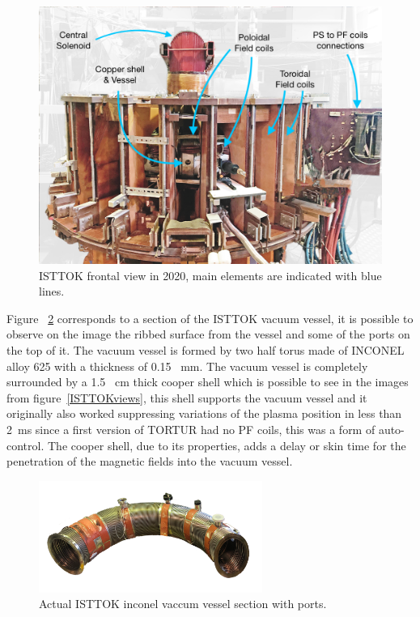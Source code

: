 \begin{figure}[htbp]
	\centering
	\includegraphics[width=1.1\textwidth]{Chp4/FrontISTTOK.png}
	\caption{\label{ISTTOK_front}ISTTOK frontal view in 2020, main elements are indicated with blue lines.   }
\end{figure}

Figure ~\ref{VV_IST} corresponds to a section of the ISTTOK vacuum vessel, it is possible to observe on the image the ribbed  surface from the vessel and some of the ports on the top of it. The vacuum vessel is formed by two half torus made of INCONEL alloy 625 with a thickness of 0.15~ mm. The vacuum vessel is completely surrounded by a 1.5 ~cm thick cooper shell which is possible to see in the images from figure~\ref{ISTTOKviews}, this shell supports the vacuum vessel and it originally  also worked suppressing  variations of the plasma position in less than 2~ms since a first version of TORTUR had no PF coils, this was a form of auto-control. The  cooper shell, due to its properties, adds a delay or skin time for the  penetration of the magnetic fields into the vacuum vessel.
\smallskip

\begin{figure}[htbp]
	\centering
	\includegraphics[width=0.65\textwidth]{Chp4/VacuumVessel_Low.png}
	\caption{\label{VV_IST} Actual ISTTOK inconel  vaccum vessel section with ports.  }
\end{figure}


